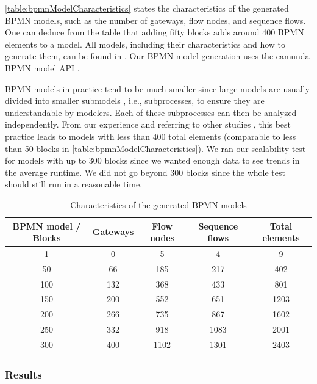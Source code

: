 \documentclass{lmcs} %
\begin{document}
\autoref{table:bpmnModelCharacteristics} states the characteristics of the generated BPMN models, such as the number of gateways, flow nodes, and sequence flows.
One can deduce from the table that adding fifty blocks adds around 400 BPMN elements to a model.
All models, including their characteristics and how to generate them, can be found in \cite{timkrauterLMCS2024Artifacts2023}.
Our BPMN model generation uses the camunda BPMN model API \cite{camundaservicesgmbhCamundaBPMNModel2023}.

BPMN models in practice tend to be much smaller since large models are usually divided into smaller submodels \cite{fahlandAnalysisDemandInstantaneous2011}, i.e., subprocesses, to ensure they are understandable by modelers.
Each of these subprocesses can then be analyzed independently.
From our experience and referring to other studies \cite{fahlandAnalysisDemandInstantaneous2011}, this best practice leads to models with less than 400 total elements (comparable to less than 50 blocks in \autoref{table:bpmnModelCharacteristics}).
We ran our scalability test for models with up to 300 blocks since we wanted enough data to see trends in the average runtime.
We did not go beyond 300 blocks since the whole test should still run in a reasonable time. 


\begin{table}[ht]
\centering
\caption{Characteristics of the generated BPMN models}
\begin{tabular}{| c | c | c | c || c |}
 \hline
 BPMN model / Blocks & Gateways & Flow nodes & Sequence flows & Total elements \\
 \hline\hline
 1 & 0 & 5 & 4 & 9 \\
 \hline
 50 & 66 & 185 & 217 & 402 \\
 \hline
 100 & 132 & 368 & 433 & 801 \\
 \hline
 150 & 200 & 552 & 651 & 1203 \\
 \hline
 200 & 266 & 735 & 867 & 1602 \\
 \hline
 250 & 332 & 918 & 1083 & 2001 \\
 \hline
 300 & 400 & 1102 & 1301 & 2403 \\
 \hline
\end{tabular}
\label{table:bpmnModelCharacteristics}
\end{table}

\subsubsection{Results}
\end{document}
